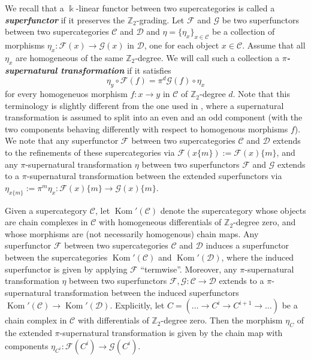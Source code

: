 \documentclass[12pt]{amsart}
\theoremstyle{definition}
\theoremstyle{plain}
\newcommand{\defw}[1]{{\bf{\textit{#1}}}}
\begin{document}
We recall that a $\Bbbk$-linear functor
between two supercategories is called a \defw{superfunctor}
if it preserves the $\mathbb{Z}_2$-grading. Let $\mathcal{F}$ and $\mathcal{G}$
be two superfunctors between two supercategories $\mathcal{C}$ and $\mathcal{D}$ and $\eta=\{\eta_x\}_{x\in\mathcal{C}}$ be
a collection of morphisms $\eta_x\colon\mathcal{F}(x)\rightarrow\mathcal{G}(x)$ in $\mathcal{D}$, one for
each object $x\in\mathcal{C}$. Assume that all $\eta_x$ are homogeneous of the same $\mathbb{Z}_2$-degree.
We will call such a collection a \defw{$\pi$-supernatural transformation}
if it satisfies
\begin{equation}\label{eqn:supernaturaldefinition}
\eta_y\circ \mathcal{F}(f)=\pi^d \mathcal{G}(f)\circ\eta_x
\end{equation}
for every homogeneuos morphism $f\colon x\rightarrow y$
in $\mathcal{C}$ of $\mathbb{Z}_2$-degree $d$. 
Note that this terminology is slightly different from the one used in \cite{BrundanEllis},
where a supernatural transformation is assumed to split into an even and an odd
component (with the two components behaving differently with respect to homogenous morphisms $f$).
We note that any superfunctor $\mathcal{F}$ between two supercategories $\mathcal{C}$ and $\mathcal{D}$ extends
to the refinements of these supercategories via $\mathcal{F}(x\{m\}):=\mathcal{F}(x)\{m\}$, and any
$\pi$-supernatural transformation $\eta$ between two superfunctors $\mathcal{F}$ and $\mathcal{G}$
extends to a $\pi$-supernatural transformation between the extended superfunctors
via $\eta_{x\{m\}}:=\pi^m\eta_x\colon\mathcal{F}(x)\{m\}\rightarrow\mathcal{G}(x)\{m\}$.

Given a supercategory $\mathcal{C}$,
let $\operatorname{Kom}'(\mathcal{C})$ denote the supercategory
whose objects are chain complexes in $\mathcal{C}$ with homogeneous differentials of $\mathbb{Z}_2$-degree zero,
and whose morphisms are (not necessarily homogenous) chain maps.
Any superfunctor $\mathcal{F}$ between two supercategories $\mathcal{C}$ and $\mathcal{D}$
induces a superfunctor between the supercategories $\operatorname{Kom}'(\mathcal{C})$ and $\operatorname{Kom}'(\mathcal{D})$,
where the induced superfunctor is given by applying $\mathcal{F}$ \enquote{termwise}.
Moreover, any $\pi$-supernatural transformation $\eta$ between two superfunctors
$\mathcal{F},\mathcal{G}\colon\mathcal{C}\rightarrow\mathcal{D}$ extends
to a $\pi$-supernatural transformation between the induced
superfunctors $\operatorname{Kom}'(\mathcal{C})\rightarrow\operatorname{Kom}'(\mathcal{D})$.
Explicitly, let $C=(\ldots \rightarrow C^i\rightarrow C^{i+1}\rightarrow\ldots)$
be a chain complex in $\mathcal{C}$ with differentials of $\mathbb{Z}_2$-degree zero. Then
the morphism $\eta_C$ of the extended $\pi$-supernatural transformation
is given by the chain map with components $\eta_{C^i}\colon\mathcal{F}(C^i)\rightarrow\mathcal{G}(C^i)$.
\end{document}
